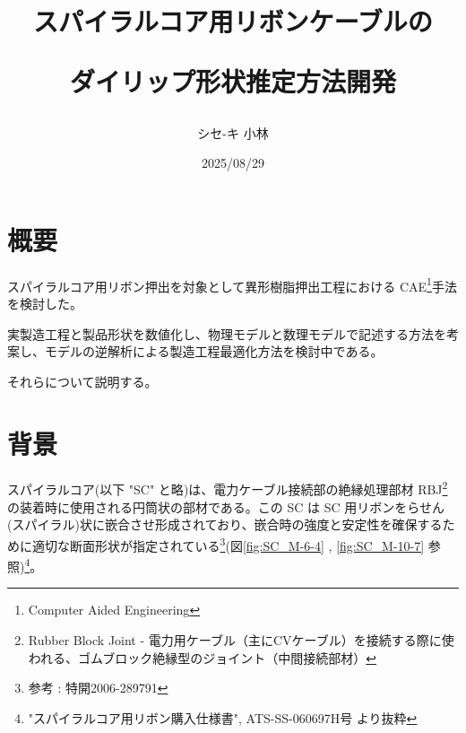 \documentclass[report]{jlreq}
\begin{document}
\title{
スパイラルコア用リボンケーブルの

ダイリップ形状推定方法開発
}
\author{シセ-キ 小林}
\date{2025/08/29}
\maketitle

\chapter{概要}
スパイラルコア用リボン押出を対象として異形樹脂押出工程における CAE\footnote{Computer Aided Engineering}手法を検討した。

実製造工程と製品形状を数値化し、物理モデルと数理モデルで記述する方法を考案し、モデルの逆解析による製造工程最適化方法を検討中である。

それらについて説明する。

\chapter{背景}
スパイラルコア({\small 以下 "SC" と略})は、電力ケーブル接続部の絶縁処理部材 RBJ\footnote{Rubber Block Joint - 電力用ケーブル（主にCVケーブル）を接続する際に使われる、ゴムブロック絶縁型のジョイント（中間接続部材）} の装着時に使用される円筒状の部材である。この SC は SC 用リボンをらせん({\small スパイラル})状に嵌合させ形成されており、嵌合時の強度と安定性を確保するために適切な断面形状が指定されている\footnote{参考 : 特開2006-289791}({\small 図\ref{fig:SC_M-6-4} , \ref{fig:SC_M-10-7} 参照})\footnote{"スパイラルコア用リボン購入仕様書", ATS-SS-060697H号 より抜粋}。
\end{document}
